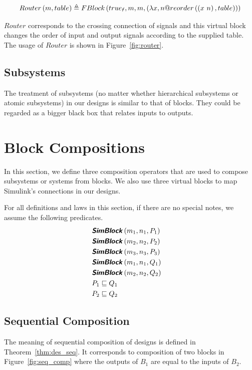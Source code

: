 \begin{definition}[Router] \label{def:router} 
    \begin{align*}
        Router\left(m, table\right) \defs FBlock\left( \logtrue{f}, m, m, \left(\lambda x, n @ reorder\left(\left(x~n\right), table\right)\right)\right) 
    \end{align*}
\end{definition}
$Router$ corresponds to the crossing connection of signals and this virtual block changes the order of input and output signals according to the supplied table. The usage of $Router$ is shown in Figure~\ref{fig:router}.

\subsection{Subsystems}
The treatment of subsystems (no matter whether hierarchical subsystems or atomic subsystems) in our designs is similar to that of blocks. They could be regarded as a bigger black box that relates inputs to outputs.

\section{Block Compositions}
\label{sec:comp}

In this section, we define three composition operators that are used to compose subsystems or systems from blocks. We also use three virtual blocks to map Simulink's connections in our designs.

For all definitions and laws in this section, if there are no special notes, we assume the following predicates. 
\begin{align*}
    & \healthy{SimBlock}\left(m_1, n_1, P_1\right) & \\
    & \healthy{SimBlock}\left(m_2, n_2, P_2\right) & \\
    & \healthy{SimBlock}\left(m_3, n_3, P_3\right) & \\
    & \healthy{SimBlock}\left(m_1, n_1, Q_1\right) & \\
    & \healthy{SimBlock}\left(m_2, n_2, Q_2\right) & \\
    & P_1 \refinedby Q_1 & \\
    &P_2 \refinedby Q_2 &
\end{align*}



\subsection{Sequential Composition}
The meaning of sequential composition of designs is defined in Theorem~\ref{thm:des_seq}. It corresponds to composition of two blocks in Figure~\ref{fig:seq_comp} where the outputs of $B_1$ are equal to the inputs of $B_2$.

